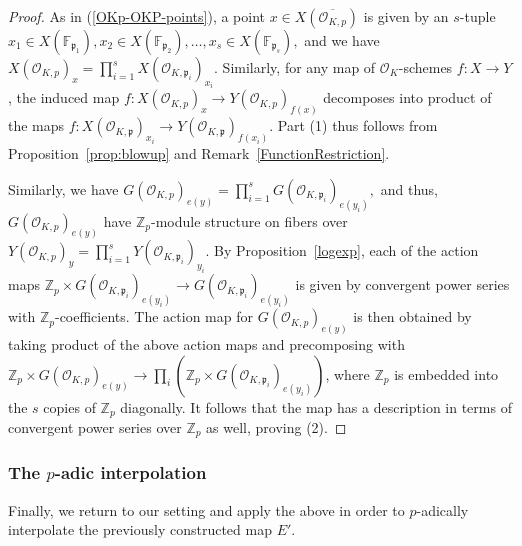 \documentclass[11pt,oneside]{amsart}
\theoremstyle{plain}
\newtheorem{corollary}[theorem]{Corollary}
\theoremstyle{definition}
\def\Z{\mathbb{Z}}
\def\F{\mathbb{F}}
\def\oh{\mathcal{O}}
\begin{document}
\begin{proof}
As in (\ref{OKp-OKP-points}), a point $x \in X(\overline{\oh_{K,p}})$ is given by an $s$-tuple $x_1 \in X(\F_{\mathfrak{p}_1}), x_2 \in X(\F_{\mathfrak{p}_2}), \dots, x_s \in X(\F_{\mathfrak{p}_s}),$ and we have $X(\oh_{K,p})_x=\prod_{i=1}^sX(\oh_{K,\mathfrak{p}_i})_{x_i}$. Similarly, for any map of $\oh_{K}$-schemes $f: X \rightarrow Y$, the induced map $f: X(\oh_{K, p})_x \rightarrow Y(\oh_{K, p})_{f(x)}$ decomposes into product of the maps $f: X(\oh_{K, \mathfrak{p}})_{x_i} \rightarrow Y(\oh_{K, \mathfrak{p}})_{f(x_i)}$. Part (1) thus follows from Proposition~\ref{prop:blowup} and Remark~\ref{FunctionRestriction}.

Similarly, we have $G(\oh_{K,p})_{e(y)}=\prod_{i=1}^sG(\oh_{K,\mathfrak{p}_i})_{e(y_i)},$ and thus, $G(\oh_{K,p})_{e(y)}$ have $\Z_p$-module structure on fibers over $Y(\oh_{K,p})_y=\prod_{i=1}^sY(\oh_{K,\mathfrak{p}_i})_{y_i}.$ By Proposition~\ref{logexp}, each of the action maps $\mathbb{Z}_p\times G(\oh_{K,\mathfrak{p}_i})_{e(y_i)}\rightarrow G(\oh_{K,\mathfrak{p}_i})_{e(y_i)}$ is given by convergent power series with $\Z_p$-coefficients. The action map for $G(\oh_{K,p})_{e(y)}$ is then obtained by taking product of the above action maps and precomposing with $\Z_p \times G(\oh_{K,p})_{e(y)}\rightarrow \prod_i (\Z_p \times  G(\oh_{K,\mathfrak{p}_i})_{e(y_i)})$, where $\Z_p$ is embedded into the $s$ copies of $\Z_p$ diagonally. It follows that the map has a description in terms of convergent power series over $\Z_p$ as well, proving (2).
\end{proof}


\subsubsection{The $p$-adic interpolation} 
Finally, we return to our setting and apply the above in order to $p$-adically interpolate the previously constructed map $E'$. 

\end{document}

